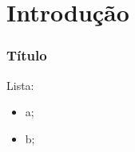 \section{Introdução}

\begin{frame}
\frametitle{Título}
Lista:
\begin{itemize}
	\item a;
	\item b;
\end{itemize}
\end{frame}
